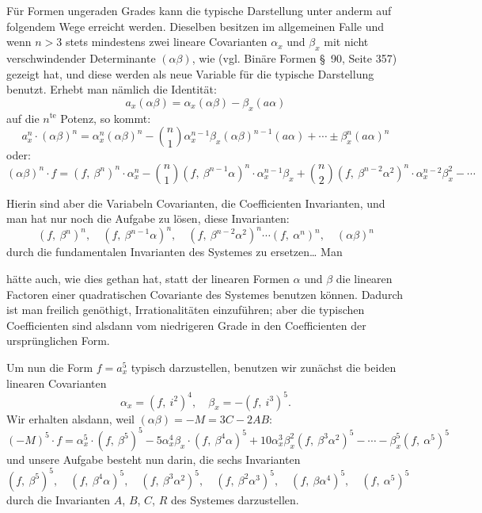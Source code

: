 \documentclass[11pt]{article}
\providecommand{\gesperrt}[1]{\textls[130]{#1}}
\providecommand{\weberpage}[1]{}
\providecommand{\weq}[2]{\begin{equation}\tag{#1}#2\end{equation}}
\begin{document}
Für Formen ungeraden Grades kann die typische Darstellung unter
anderm auf folgendem Wege erreicht werden. Dieselben besitzen im
allgemeinen Falle und wenn $n > 3$ stets mindestens zwei lineare
Covarianten $\alpha_x$ und $\beta_x$ mit nicht verschwindender Determinante $(\alpha\beta)$,
wie \gesperrt{Clebsch} (vgl. \glqq Binäre Formen\grqq{} \S~90, Seite 357) gezeigt hat, und
diese werden als neue Variable für die typische Darstellung benutzt.
Erhebt man nämlich die Identität:
\[
a_x(\alpha\beta) = \alpha_x(\alpha\beta) - \beta_x(a\alpha)
\]
auf die $n^{\mathrm{te}}$ Potenz, so kommt:
\[
a_x^n \cdot (\alpha\beta)^n = \alpha_x^n(\alpha\beta)^n - \binom{n}{1}\alpha_x^{n-1}\beta_x(\alpha\beta)^{n-1}(a\alpha) + \cdots \pm \beta_x^n(a\alpha)^n
\]
oder:
\weq{I}{(\alpha\beta)^n \cdot f = (f,\ \beta^n)^n \cdot \alpha_x^n - \binom{n}{1}(f,\ \beta^{n-1}\alpha)^n \cdot \alpha_x^{n-1}\beta_x
+ \binom{n}{2}(f,\ \beta^{n-2}\alpha^2)^n \cdot \alpha_x^{n-2}\beta_x^2 - \cdots}

Hierin sind aber die Variabeln Covarianten, die Coefficienten Invarianten,
und man hat nur noch die Aufgabe zu lösen, diese Invarianten:
\weq{II}{(f,\ \beta^n)^n,\quad (f,\ \beta^{n-1}\alpha)^n,\quad (f,\ \beta^{n-2}\alpha^2)^n \cdots (f,\ \alpha^n)^n,\quad (\alpha\beta)^n}
durch die fundamentalen Invarianten des Systemes zu ersetzen\ldots{} Man


\weberpage{254}

hätte auch, wie dies \gesperrt{Hermite} gethan hat, statt der linearen Formen
$\alpha$ und $\beta$ die linearen Factoren einer quadratischen Covariante des
Systemes benutzen können. Dadurch ist man freilich genöthigt, Irrationalitäten
einzuführen; aber die typischen Coefficienten sind alsdann
vom niedrigeren Grade in den Coefficienten der ursprünglichen Form.

Um nun die Form $f = a_x^5$ typisch darzustellen, benutzen wir zunächst
die beiden linearen Covarianten
\[
\alpha_x = (f,\ i^2)^4, \quad \beta_x = -(f,\ i^3)^5.
\]
Wir erhalten alsdann, weil $(\alpha\beta) = -M = 3C - 2AB$:
\[
(-M)^5 \cdot f = \alpha_x^5 \cdot (f,\ \beta^5)^5 - 5\alpha_x^4\beta_x \cdot (f,\ \beta^4\alpha)^5
+ 10\alpha_x^3\beta_x^2(f,\ \beta^3\alpha^2)^5 - \cdots - \beta_x^5(f,\ \alpha^5)^5
\]
und unsere Aufgabe besteht nun darin, die sechs Invarianten
\[
(f,\ \beta^5)^5,\quad (f,\ \beta^4\alpha)^5,\quad (f,\ \beta^3\alpha^2)^5,\quad (f,\ \beta^2\alpha^3)^5,\quad (f,\ \beta\alpha^4)^5,\quad (f,\ \alpha^5)^5
\]
durch die Invarianten $A$, $B$, $C$, $R$ des Systemes darzustellen.
\end{document}
